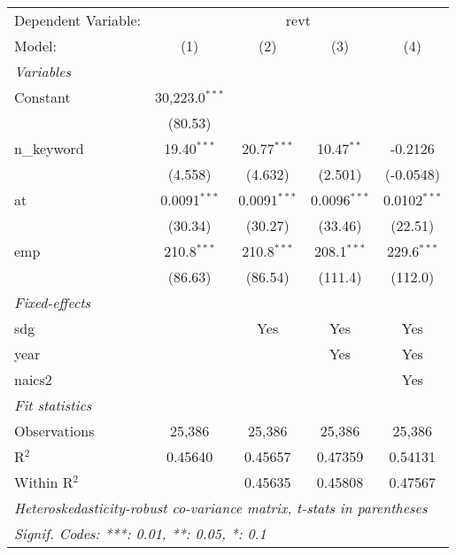 
\begingroup
\centering
\begin{tabular}{lcccc}
   \tabularnewline \midrule \midrule
   Dependent Variable: & \multicolumn{4}{c}{revt}\\
   Model:       & (1)              & (2)            & (3)            & (4)\\  
   \midrule
   \emph{Variables}\\
   Constant     & 30,223.0$^{***}$ &                &                &   \\   
                & (80.53)          &                &                &   \\   
   n\_keyword   & 19.40$^{***}$    & 20.77$^{***}$  & 10.47$^{**}$   & -0.2126\\   
                & (4.558)          & (4.632)        & (2.501)        & (-0.0548)\\   
   at           & 0.0091$^{***}$   & 0.0091$^{***}$ & 0.0096$^{***}$ & 0.0102$^{***}$\\   
                & (30.34)          & (30.27)        & (33.46)        & (22.51)\\   
   emp          & 210.8$^{***}$    & 210.8$^{***}$  & 208.1$^{***}$  & 229.6$^{***}$\\   
                & (86.63)          & (86.54)        & (111.4)        & (112.0)\\   
   \midrule
   \emph{Fixed-effects}\\
   sdg          &                  & Yes            & Yes            & Yes\\  
   year         &                  &                & Yes            & Yes\\  
   naics2       &                  &                &                & Yes\\  
   \midrule
   \emph{Fit statistics}\\
   Observations & 25,386           & 25,386         & 25,386         & 25,386\\  
   R$^2$        & 0.45640          & 0.45657        & 0.47359        & 0.54131\\  
   Within R$^2$ &                  & 0.45635        & 0.45808        & 0.47567\\  
   \midrule \midrule
   \multicolumn{5}{l}{\emph{Heteroskedasticity-robust co-variance matrix, t-stats in parentheses}}\\
   \multicolumn{5}{l}{\emph{Signif. Codes: ***: 0.01, **: 0.05, *: 0.1}}\\
\end{tabular}
\par\endgroup


